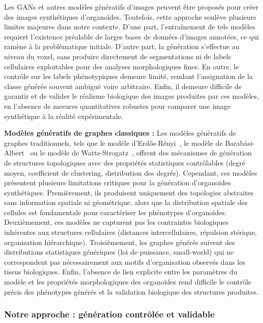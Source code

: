 Les GANs et autres modèles génératifs d'images peuvent être proposés pour créer des images synthétiques d'organoïdes. Toutefois, cette approche soulève plusieurs limites majeures dans notre contexte. D'une part, l'entraînement de tels modèles requiert l'existence préalable de larges bases de données d'images annotées, ce qui ramène à la problématique initiale. D'autre part, la génération s'effectue au niveau du voxel, sans produire directement de segmentations ni de labels cellulaires exploitables pour des analyses morphologiques fines. En outre, le contrôle sur les labels phénotypiques demeure limité, rendant l'assignation de la classe générée souvent ambiguë voire arbitraire. Enfin, il demeure difficile de garantir et de valider le réalisme biologique des images produites par ces modèles, en l'absence de mesures quantitatives robustes pour comparer une image synthétique à la réalité expérimentale.

\textbf{Modèles génératifs de graphes classiques :}
Les modèles génératifs de graphes traditionnels, tels que le modèle d'Erdős-Rényi~\cite{Erdos1959}, le modèle de Barabási-Albert~\cite{Barabasi1999} ou le modèle de Watts-Strogatz~\cite{Watts1998}, offrent des mécanismes de génération de structures topologiques avec des propriétés statistiques contrôlables (degré moyen, coefficient de clustering, distribution des degrés). Cependant, ces modèles présentent plusieurs limitations critiques pour la génération d'organoïdes synthétiques. Premièrement, ils produisent uniquement des topologies abstraites sans information spatiale ni géométrique, alors que la distribution spatiale des cellules est fondamentale pour caractériser les phénotypes d'organoïdes. Deuxièmement, ces modèles ne capturent pas les contraintes biologiques inhérentes aux structures cellulaires (distances intercellulaires, répulsion stérique, organisation hiérarchique). Troisièmement, les graphes générés suivent des distributions statistiques génériques (loi de puissance, small-world) qui ne correspondent pas nécessairement aux motifs d'organisation observés dans les tissus biologiques. Enfin, l'absence de lien explicite entre les paramètres du modèle et les propriétés morphologiques des organoïdes rend difficile le contrôle précis des phénotypes générés et la validation biologique des structures produites.

\subsubsection{Notre approche : génération contrôlée et validable}

